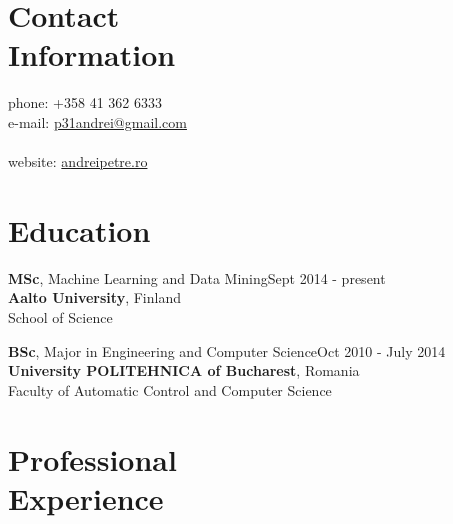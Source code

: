 \documentclass[margin,line]{resume}
\begin{document}
\begin{resume}

    \section{\mysidestyle Contact\\Information}

	phone: +358 41 362 6333              \\
	e-mail:  \href{mailto:p31andrei@gmail.com}{p31andrei@gmail.com}  \vspace{0mm}\\\vspace{-4.5mm}\\%
	website: \href{http://andreipetre.ro}{andreipetre.ro}

    \section{\mysidestyle Education}

	\textbf{MSc}, Machine Learning and Data Mining\hfill Sept 2014 - present\\
	\textbf{Aalto University}, Finland\\
	School of Science

	\textbf{BSc}, Major in Engineering and Computer Science\hfill Oct 2010 - July 2014\\
	\textbf{University POLITEHNICA of Bucharest}, Romania\\
	Faculty of Automatic Control and Computer Science

    \section{\mysidestyle Professional\\Experience}


\end{resume}
\end{document}

